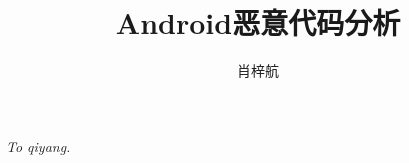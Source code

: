 \documentclass[UTF8, a4paper, 11pt, oneside]{ctexbook}
\begin{document}
\frontmatter
\title{Android恶意代码分析}
\author{肖梓航}
\date{}
\maketitle

\vfill
\thispagestyle{empty}
\begin{center}
\it{To qiyang.}
\end{center}
\vfill



\tableofcontents
\setcounter{tocdepth}{3}

\mainmatter





\appendix

\backmatter

\printindex
\end{document}
